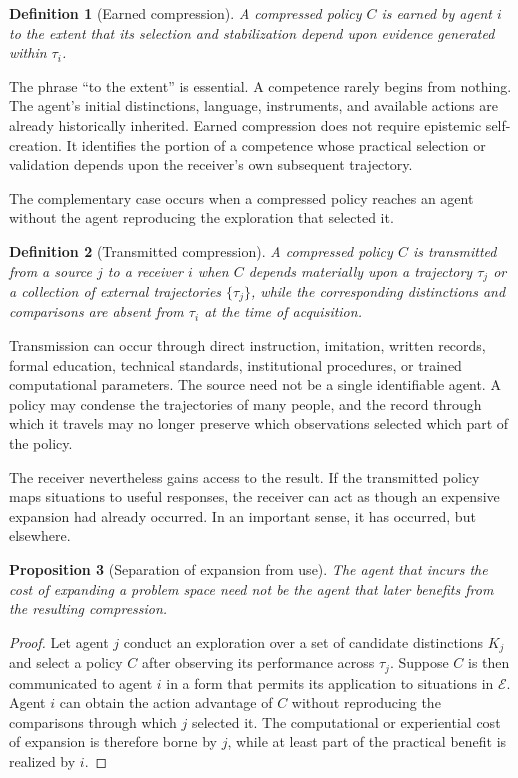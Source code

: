 \documentclass[11pt]{article}
\newtheorem{proposition}{Proposition}[section]
\newtheorem{definition}[proposition]{Definition}
\begin{document}
\begin{definition}[Earned compression]
A compressed policy $C$ is earned by agent $i$ to the extent that its selection and stabilization depend upon evidence generated within $\tau_i$.
\end{definition}

The phrase ``to the extent'' is essential. A competence rarely begins from nothing. The agent's initial distinctions, language, instruments, and available actions are already historically inherited. Earned compression does not require epistemic self-creation. It identifies the portion of a competence whose practical selection or validation depends upon the receiver's own subsequent trajectory.

The complementary case occurs when a compressed policy reaches an agent without the agent reproducing the exploration that selected it.

\begin{definition}[Transmitted compression]
A compressed policy $C$ is transmitted from a source $j$ to a receiver $i$ when $C$ depends materially upon a trajectory $\tau_j$ or a collection of external trajectories $\{\tau_j\}$, while the corresponding distinctions and comparisons are absent from $\tau_i$ at the time of acquisition.
\end{definition}

Transmission can occur through direct instruction, imitation, written records, formal education, technical standards, institutional procedures, or trained computational parameters. The source need not be a single identifiable agent. A policy may condense the trajectories of many people, and the record through which it travels may no longer preserve which observations selected which part of the policy.

The receiver nevertheless gains access to the result. If the transmitted policy maps situations to useful responses, the receiver can act as though an expensive expansion had already occurred. In an important sense, it has occurred, but elsewhere.

\begin{proposition}[Separation of expansion from use]
The agent that incurs the cost of expanding a problem space need not be the agent that later benefits from the resulting compression.
\end{proposition}

\begin{proof}
Let agent $j$ conduct an exploration over a set of candidate distinctions $K_j$ and select a policy $C$ after observing its performance across $\tau_j$. Suppose $C$ is then communicated to agent $i$ in a form that permits its application to situations in $\mathcal{E}$. Agent $i$ can obtain the action advantage of $C$ without reproducing the comparisons through which $j$ selected it. The computational or experiential cost of expansion is therefore borne by $j$, while at least part of the practical benefit is realized by $i$.
\end{proof}
\end{document}
